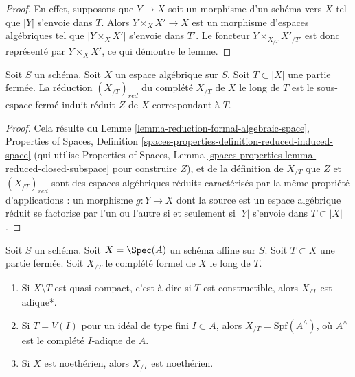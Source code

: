 \begin{proof}
En effet, supposons que $Y \to X$ soit un morphisme d'un schéma vers $X$ tel
que $|Y|$ s'envoie dans $T$. Alors $Y \times_X X' \to X$ est un morphisme
d'espaces algébriques tel que $|Y \times_X X'|$ s'envoie dans $T'$. Le
foncteur $Y \times_{X_{/T}} X'_{/T'}$ est donc représenté par $Y \times_X X'$,
ce qui démontre le lemme.
\end{proof}

\begin{lemma}
\label{lemma-reduction-completion}
Soit $S$ un schéma. Soit $X$ un espace algébrique sur $S$.
Soit $T \subset |X|$ une partie fermée. La réduction $(X_{/T})_{red}$
du complété $X_{/T}$ de $X$ le long de $T$ est
le sous-espace fermé induit réduit $Z$ de $X$ correspondant à $T$.
\end{lemma}

\begin{proof}
Cela résulte du Lemme \ref{lemma-reduction-formal-algebraic-space},
Properties of Spaces, Definition
\ref{spaces-properties-definition-reduced-induced-space}
(qui utilise Properties of Spaces, Lemma
\ref{spaces-properties-lemma-reduced-closed-subspace} pour construire $Z$),
et de la définition de $X_{/T}$ que
$Z$ et $(X_{/T})_{red}$ sont des espaces algébriques réduits
caractérisés par la même propriété d'applications :
un morphisme $g : Y \to X$ dont la source est un espace algébrique réduit
se factorise par l'un ou l'autre si et seulement si $|Y|$ s'envoie dans $T \subset |X|$.
\end{proof}

\begin{lemma}
\label{lemma-affine-formal-completion-types}
Soit $S$ un schéma. Soit $X = \Spec(A)$ un schéma affine sur $S$.
Soit $T \subset X$ une partie fermée. Soit $X_{/T}$ le
complété formel de $X$ le long de $T$.
\begin{enumerate}
\item Si $X \setminus T$ est quasi-compact, c'est-à-dire si $T$ est constructible,
alors $X_{/T}$ est adique*.
\item Si $T = V(I)$ pour un idéal de type fini $I \subset A$,
alors $X_{/T} = \text{Spf}(A^\wedge)$, où $A^\wedge$ est le
complété $I$-adique de $A$.
\item Si $X$ est noethérien, alors $X_{/T}$ est noethérien.
\end{enumerate}
\end{lemma}

